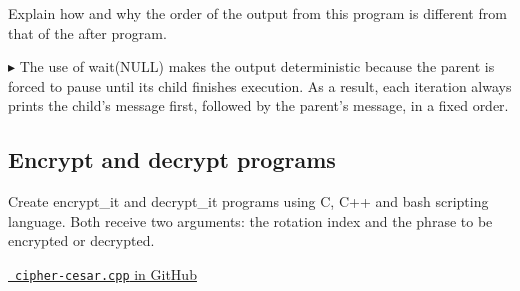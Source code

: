 \documentclass[12pt]{article}
\begin{document}
Explain how and why the order of the output from this program is
different from that of the after program.

\(\blacktriangleright\)
The use of wait(NULL) makes the output deterministic because the parent is forced to pause until its child finishes execution. As a result, each iteration always prints the child’s message first, followed by the parent’s message, in a fixed order.

\subsection{Encrypt and decrypt programs}

Create encrypt\_it and decrypt\_it programs using C, C++ and bash scripting language. Both receive two arguments: the rotation index and the phrase to be encrypted or decrypted.


\begin{center}
    \href{https://github.com/jucollas/parallel-programming/blob/main/practical-session-1/scripts/cfiles/cipher-cesar.cpp}{\faGithub\ \texttt{cipher-cesar.cpp} in GitHub}
\end{center}
\end{document}
